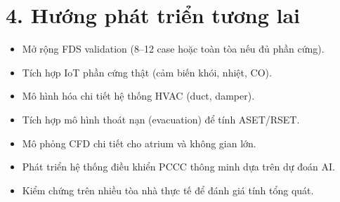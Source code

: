 \section*{4. Hướng phát triển tương lai}

\begin{itemize}
  \item Mở rộng FDS validation (8--12 case hoặc toàn tòa nếu đủ phần cứng).
  \item Tích hợp IoT phần cứng thật (cảm biến khói, nhiệt, CO).
  \item Mô hình hóa chi tiết hệ thống HVAC (duct, damper).
  \item Tích hợp mô hình thoát nạn (evacuation) để tính ASET/RSET.
  \item Mô phỏng CFD chi tiết cho atrium và không gian lớn.
  \item Phát triển hệ thống điều khiển PCCC thông minh dựa trên dự đoán AI.
  \item Kiểm chứng trên nhiều tòa nhà thực tế để đánh giá tính tổng quát.
\end{itemize}

